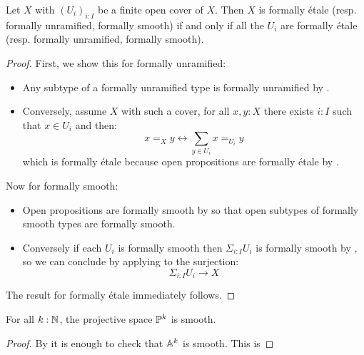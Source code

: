 \begin{lemma}\label{etale-zariski-local}
Let $X$ with $(U_i)_{i:I}$ be a finite open cover of $X$. Then $X$ is formally étale (resp. formally unramified, formally smooth) if and only if all the $U_i$ are formally étale (resp. formally unramified, formally smooth).
\end{lemma}

\begin{proof}
First, we show this for formally unramified:
\begin{itemize}
\item Any subtype of a formally unramified type is formally unramified by .
\item Conversely, assume $X$ with such a cover, for all $x,y:X$ there exists $i:I$ such that $x\in U_i$ and then:
\[x=_Xy \leftrightarrow \sum_{y\in U_i} x=_{U_i}y \]
which is formally étale because open propositions are formally étale by .
\end{itemize}
Now for formally smooth:
\begin{itemize}
\item Open propositions are formally smooth by  so that open subtypes of formally smooth types are formally smooth.
\item Conversely if each $U_i$ is formally smooth then $\Sigma_{i:I}U_i$ is formally smooth by , so we can conclude by applying  to the surjection:
\[\Sigma_{i:I}U_i \to X\]
\end{itemize}
The result for formally étale immediately follows.
\end{proof}

\begin{corollary}
For all $k:\mathbb{N}$, the projective space $\mathbb{P}^k$ is smooth.
\end{corollary}

\begin{proof}
By  it is enough to check that $\mathbb{A}^k$ is smooth. This is 
\end{proof}




